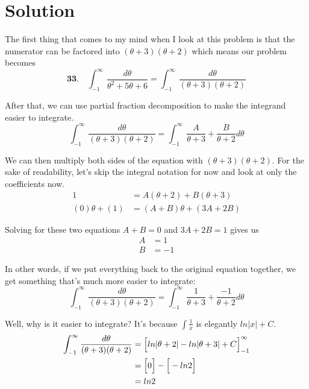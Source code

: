 
\section*{Solution}
The first thing that comes to my mind
when I look at this problem is that
the numerator can be factored into
$ (\theta + 3)(\theta + 2) $ which
means our problem becomes
\begin{equation}
	\textbf{33.}\quad \int_{-1}^{\infty} 
	\frac{d\theta}{\theta^2+5\theta+6}
	=
	\int_{-1}^{\infty} 
	\frac{d\theta}{(\theta + 3)(\theta + 2)}	
\end{equation}

After that, we can use partial fraction decomposition
to make the integrand easier to integrate.
\begin{equation}
	\int_{-1}^{\infty} 
	\frac{d\theta}{(\theta + 3)(\theta + 2)}
	=
	\int_{-1}^{\infty} 
	\frac{A}{\theta + 3} + \frac{B}{\theta + 2} d\theta
\end{equation}

We can then multiply both sides of the
equation with $ (\theta + 3)(\theta + 2) $.
For the sake of readability, let's 
skip the integral notation for now
and look at only the coefficients now.
\begin{align}
	1
	&=
	A(\theta + 2) + B(\theta + 3) \\
	(0)\theta + (1)
	&=
	(A+B)\theta + (3A + 2B)
\end{align}

Solving for these two equations
$ A + B = 0 $ and 
$ 3A + 2B = 1 $ gives us
\begin{align}
	A &= 1 \\
	B &= -1
\end{align}

In other words, if we put everything 
back to the original equation together,
we get something that's much more easier
to integrate: 
\begin{equation*}
	\int_{-1}^{\infty} 
	\frac{d\theta}{(\theta + 3)(\theta + 2)}
	=
	\int_{-1}^{\infty} 
	\frac{1}{\theta + 3} + \frac{-1}{\theta + 2} d\theta
\end{equation*}

\newpage

Well, why is it easier to integrate?
It's because 
$ \int \frac{1}{x} $ is elegantly
$ ln|x| + C $.
\begin{align}
	\int_{-1}^{\infty} 
	\frac{d\theta}{(\theta + 3)(\theta + 2)}
	&=
	\Bigl[
	ln|\theta + 2| - 
	ln|\theta + 3| + C
	\Bigr]_{-1}^{\infty} \\
	&=
	\Big[
	0
	\Big]
	-
	\Big[
	-ln2
	\Big] \\
	&=
	ln2
\end{align}






